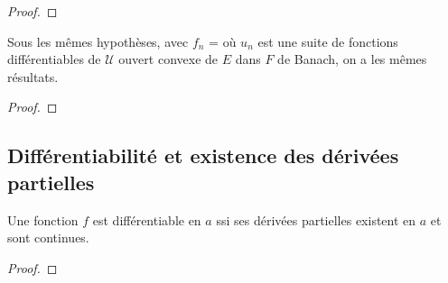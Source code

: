 \begin{proof}
	
\end{proof}

\begin{corollary}
	Sous les mêmes hypothèses, avec $f_{n}$ =  où
	$u_{n}$ est une suite de fonctions différentiables de $\mathcal{U}$ ouvert
	convexe de $E$ dans $F$ de Banach, on a les mêmes résultats.
\end{corollary}

\begin{proof}
	
\end{proof}

\subsection{Différentiabilité et existence des dérivées partielles}

\begin{theorem}
\label{theorem_partial_derivative_existence}
	Une fonction $f$ est différentiable en $a$ ssi ses dérivées partielles
	existent en $a$ et sont continues.
\end{theorem}

\begin{proof}
	
\end{proof}
